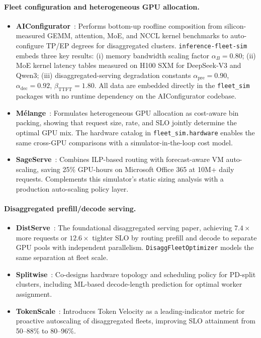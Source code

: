 \documentclass[11pt,a4paper]{article}
\begin{document}
\paragraph{Fleet configuration and heterogeneous GPU allocation.}
\begin{itemize}[nosep]
  \item \textbf{AIConfigurator}~\citep{xu2025aiconfigurator}:
    Performs bottom-up roofline composition from silicon-measured GEMM,
    attention, MoE, and NCCL kernel benchmarks to auto-configure TP/EP
    degrees for disaggregated clusters.
    \texttt{inference-fleet-sim} embeds three key results:
    (i) memory bandwidth scaling factor $\alpha_{B} = 0.80$;
    (ii) MoE kernel latency tables measured on H100 SXM for DeepSeek-V3
    and Qwen3; (iii) disaggregated-serving degradation constants
    $\alpha_{\text{pre}} = 0.90$, $\alpha_{\text{dec}} = 0.92$,
    $\beta_{\text{TTFT}} = 1.80$.
    All data are embedded directly in the \texttt{fleet\_sim} packages
    with no runtime dependency on the AIConfigurator codebase.
  \item \textbf{M\'{e}lange}~\citep{griggs2024melange}:
    Formulates heterogeneous GPU allocation as cost-aware bin packing,
    showing that request size, rate, and SLO jointly determine the
    optimal GPU mix.  The hardware catalog in
    \texttt{fleet\_sim.hardware} enables the same cross-GPU comparisons
    with a simulator-in-the-loop cost model.
  \item \textbf{SageServe}~\citep{jia2025sageserve}:
    Combines ILP-based routing with forecast-aware VM auto-scaling, saving
    25\% GPU-hours on Microsoft Office 365 at 10M+ daily requests.
    Complements this simulator's static sizing analysis with a production
    auto-scaling policy layer.
\end{itemize}

\paragraph{Disaggregated prefill/decode serving.}
\begin{itemize}[nosep]
  \item \textbf{DistServe}~\citep{zhong2024distserve}:
    The foundational disaggregated serving paper, achieving
    $7.4\times$ more requests or $12.6\times$ tighter SLO by routing
    prefill and decode to separate GPU pools with independent
    parallelism.  \texttt{DisaggFleetOptimizer} models the same
    separation at fleet scale.
  \item \textbf{Splitwise}~\citep{patel2024splitwise}:
    Co-designs hardware topology and scheduling policy for PD-split
    clusters, including ML-based decode-length prediction for optimal
    worker assignment.
  \item \textbf{TokenScale}~\citep{tokenscale2024}:
    Introduces Token Velocity as a leading-indicator metric for proactive
    autoscaling of disaggregated fleets, improving SLO attainment from
    50--88\% to 80--96\%.
\end{itemize}
\end{document}
